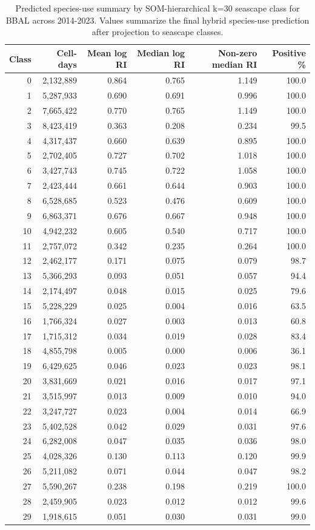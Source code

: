 \begin{table}[htbp]
\centering
\scriptsize
\caption{Predicted species-use summary by SOM-hierarchical k=30 seascape class for BBAL across 2014-2023. Values summarize the final hybrid species-use prediction after projection to seascape classes.}
\label{tab:appendix-predicted-seascape-use-bbal}
\begin{tabular}{rrrrrr}
\hline
Class & Cell-days & Mean log RI & Median log RI & Non-zero median RI & Positive \% \\
\hline
0 & 2,132,889 & 0.864 & 0.765 & 1.149 & 100.0 \\
1 & 5,287,933 & 0.690 & 0.691 & 0.996 & 100.0 \\
2 & 7,665,422 & 0.770 & 0.765 & 1.149 & 100.0 \\
3 & 8,423,419 & 0.363 & 0.208 & 0.234 & 99.5 \\
4 & 4,317,437 & 0.660 & 0.639 & 0.895 & 100.0 \\
5 & 2,702,405 & 0.727 & 0.702 & 1.018 & 100.0 \\
6 & 3,427,743 & 0.745 & 0.722 & 1.058 & 100.0 \\
7 & 2,423,444 & 0.661 & 0.644 & 0.903 & 100.0 \\
8 & 6,528,685 & 0.523 & 0.476 & 0.609 & 100.0 \\
9 & 6,863,371 & 0.676 & 0.667 & 0.948 & 100.0 \\
10 & 4,942,232 & 0.605 & 0.540 & 0.717 & 100.0 \\
11 & 2,757,072 & 0.342 & 0.235 & 0.264 & 100.0 \\
12 & 2,462,177 & 0.171 & 0.075 & 0.079 & 98.7 \\
13 & 5,366,293 & 0.093 & 0.051 & 0.057 & 94.4 \\
14 & 2,174,497 & 0.048 & 0.015 & 0.025 & 79.6 \\
15 & 5,228,229 & 0.025 & 0.004 & 0.016 & 63.5 \\
16 & 1,766,324 & 0.027 & 0.003 & 0.013 & 60.8 \\
17 & 1,715,312 & 0.034 & 0.019 & 0.028 & 83.4 \\
18 & 4,855,798 & 0.005 & 0.000 & 0.006 & 36.1 \\
19 & 6,429,625 & 0.046 & 0.023 & 0.023 & 98.1 \\
20 & 3,831,669 & 0.021 & 0.016 & 0.017 & 97.1 \\
21 & 3,515,997 & 0.013 & 0.009 & 0.010 & 94.0 \\
22 & 3,247,727 & 0.023 & 0.004 & 0.014 & 66.9 \\
23 & 5,402,528 & 0.042 & 0.029 & 0.031 & 97.6 \\
24 & 6,282,008 & 0.047 & 0.035 & 0.036 & 98.0 \\
25 & 4,028,326 & 0.130 & 0.113 & 0.120 & 99.9 \\
26 & 5,211,082 & 0.071 & 0.044 & 0.047 & 98.2 \\
27 & 5,590,267 & 0.238 & 0.198 & 0.219 & 100.0 \\
28 & 2,459,905 & 0.023 & 0.012 & 0.012 & 99.6 \\
29 & 1,918,615 & 0.051 & 0.030 & 0.031 & 99.0 \\
\hline
\end{tabular}
\end{table}

